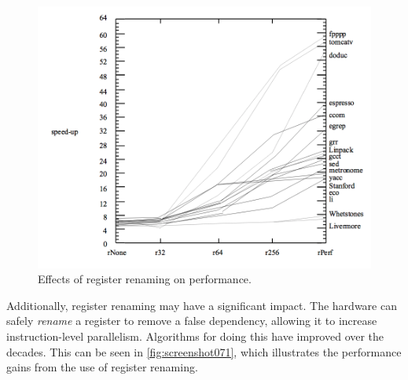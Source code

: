\begin{figure}
\centering
\includegraphics[width=0.7\linewidth]{screenshot071}
\caption{Effects of register renaming on performance.}
\label{fig:screenshot071}
\end{figure}


Additionally, register renaming may have a significant impact. The hardware can safely \textit{rename} a register to remove a false dependency, allowing it to increase instruction-level parallelism. Algorithms for doing this have improved over the decades. This can be seen in \autoref{fig:screenshot071}, which illustrates the performance gains from the use of register renaming.
